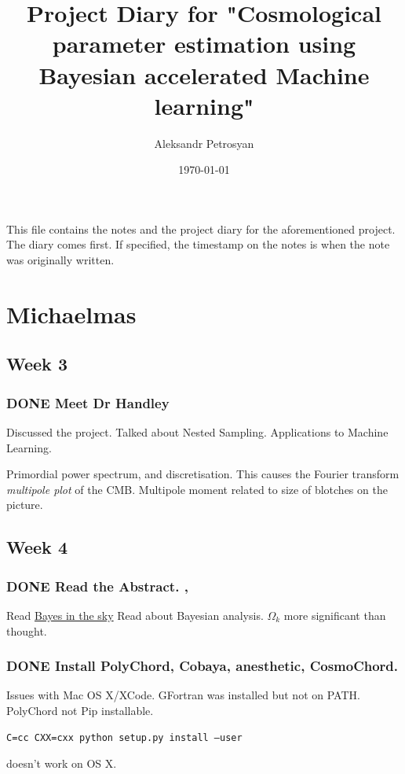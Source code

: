 \documentclass[11pt]{article}
\author{Aleksandr Petrosyan}
\date{\today}
\title{Project Diary for "Cosmological parameter estimation using Bayesian accelerated Machine learning"}
\begin{document}
\maketitle
\tableofcontents

This file contains the notes and the project diary for the
aforementioned project. The diary comes first. If specified, the
timestamp on the notes is when the note was originally written.


\section{Michaelmas}
\label{sec:orgb16a5e7}
\subsection{Week 3}
\label{sec:org88e5f7e}
\subsubsection{{\bfseries\sffamily DONE} Meet Dr Handley}
\label{sec:org70dbecc}
Discussed the project. Talked about Nested
Sampling. Applications to Machine Learning.

Primordial power spectrum, and discretisation. This causes the
Fourier transform \emph{multipole plot} of the CMB. Multipole
moment related to size of blotches on the picture.

\subsection{Week 4}
\label{sec:org8ce2216}
\subsubsection{{\bfseries\sffamily DONE} Read the Abstract. ,}
\label{sec:org2666e03}
Read \href{https://arxiv.org/abs/0803.4089}{Bayes in the sky} Read about Bayesian analysis. 
\(\Omega_{k}\) more significant than thought. 
\subsubsection{{\bfseries\sffamily DONE} Install PolyChord, Cobaya, anesthetic, CosmoChord.}
\label{sec:orgf05707d}
Issues with Mac OS X/XCode. 
GFortran was installed but not on PATH. 
PolyChord not Pip installable. 
\begin{verbatim}
C=cc CXX=cxx python setup.py install —user
\end{verbatim}
doesn't work on OS X. 
\end{document}
